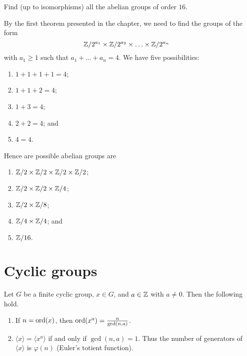 \begin{example}
    Find (up to isomorphisms) all the abelian groups of order $16$.
\end{example}

\begin{solution}
    By the first theorem presented in the chapter, we need to find the groups of the form
    \[
        \mathbb{Z}/2^{a_1} \times \mathbb{Z}/2^{a_2} \times \ldots \times \mathbb{Z}/2^{a_n}
    \]
    with $a_1 \geq 1$ such that $a_1 + \ldots + a_n = 4$.
    We have five possibilities:
    \begin{enumerate}
        \item $1 + 1 + 1 + 1 = 4$;
        \item $1 + 1 + 2 = 4$;
        \item $1 + 3 = 4$;
        \item $2 + 2 = 4$; and
        \item $4 = 4$.
    \end{enumerate}
    Hence are possible abelian groups are
    \begin{enumerate}
        \item $\mathbb{Z}/2 \times \mathbb{Z}/2 \times \mathbb{Z}/2 \times \mathbb{Z}/2$;
        \item $\mathbb{Z}/2 \times \mathbb{Z}/2 \times \mathbb{Z}/4$;
        \item $\mathbb{Z}/2 \times \mathbb{Z}/8$;
        \item $\mathbb{Z}/4 \times \mathbb{Z}/4$; and
        \item $\mathbb{Z}/16$.
    \end{enumerate}
\end{solution}

\section{Cyclic groups}

\begin{theorem}[]
    Let 
    $G$ be a finite cyclic group, 
    $x \in G$, 
    and $a \in \mathbb{Z}$ with $a \neq 0$.
    Then the following hold.
    \begin{enumerate}
        \item 
            If $n = \operatorname{ord}(x)$, then $\operatorname{ord}(x^a) = \frac{n}{\gcd(n,a)}$.

        \item 
            $\langle x \rangle = \langle x^a \rangle$ if and only if $\gcd(n,a) = 1$.
            Thus the number of generators of $\langle x \rangle$ is $\varphi(n)$
            (Euler's totient function).
    \end{enumerate}
\end{theorem}

